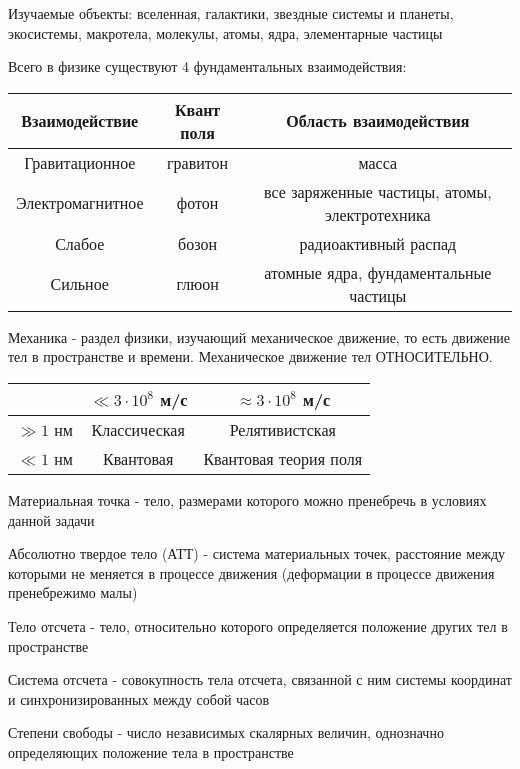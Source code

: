 \documentclass[12pt]{article}
\begin{document}
    Изучаемые объекты: вселенная, галактики, звездные системы и планеты, экосистемы, макротела, молекулы, атомы, ядра,
    элементарные частицы

    Всего в физике существуют 4 фундаментальных взаимодействия:

    \begin{tabular}{c|c|c}
        Взаимодействие   & Квант поля & Область взаимодействия                        \\ \hline
        Гравитационное   & гравитон   & масса                                         \\
        Электромагнитное & фотон      & все заряженные частицы, атомы, электротехника \\
        Слабое           & бозон      & радиоактивный распад                          \\
        Сильное          & глюон      & атомные ядра, фундаментальные частицы         \\
    \end{tabular}

    Механика - раздел физики, изучающий механическое движение, то есть движение тел в пространстве и времени.
    Механическое движение тел ОТНОСИТЕЛЬНО.

    \begin{tabular}{c|c|c|}
        & $\ll 3 \cdot 10^8$ м/с & $\approx 3 \cdot 10^8$ м/с \\ \hline
        $\gg 1$ нм & Классическая           & Релятивистская             \\ \hline
        $\ll 1$ нм & Квантовая              & Квантовая теория поля      \\ \hline
    \end{tabular}

    Материальная точка - тело, размерами которого можно пренебречь в условиях данной задачи

    Абсолютно твердое тело (АТТ) - система материальных точек, расстояние между которыми не меняется
    в процессе движения (деформации в процессе движения пренебрежимо малы)

    Тело отсчета - тело, относительно которого определяется положение других тел в пространстве

    Система отсчета - совокупность тела отсчета, связанной с ним системы координат и синхронизированных между собой часов


    Степени свободы - число независимых скалярных величин, однозначно определяющих положение тела в пространстве
\end{document}
